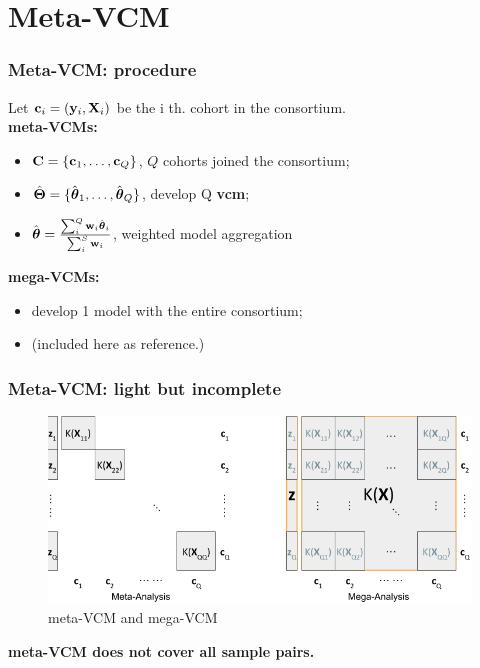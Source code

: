 \documentclass{beamer}
\begin{document}
\section{Meta-VCM}
\begin{frame}\frametitle{Meta-VCM: procedure}
  Let $\mathbf{c}_i=(\mathbf{y}_i, \mathbf{X}_i)$ be the i th. cohort in the consortium. \\
  \textbf{{\color{red}meta}-VCMs:}
  \begin{itemize}
  \item $\mathbf{C} = \{\mathbf{c}_1, \dots, \mathbf{c}_Q \}$, $Q$ cohorts joined the
    consortium;
  \item $\hat{\boldsymbol{\Theta}}=\{\hat{\boldsymbol{\theta}}_1, \dots, \hat{\boldsymbol{\theta}}_Q\}$,
    develop Q \textbf{vcm};
  \item
    $\hat{\boldsymbol{\theta}} = \frac{\sum_i^Q \mathbf{w}_i \hat{\boldsymbol{\theta}}_i}{\sum_i^S
      \mathbf{w}_i}$, weighted model aggregation
  \end{itemize}
  \textbf{{\color{red}mega}-VCMs:}
  \begin{itemize}
  \item develop 1 model with the entire consortium;
  \item (included here as reference.)
  \end{itemize}
\end{frame}
\begin{frame}\frametitle{Meta-VCM: light but incomplete}
  \begin{figure}
    \centering \includegraphics[width=.9\textwidth]{img/meta-mega}
    \caption{meta-VCM and mega-VCM}
    \label{fig:info_comp}
  \end{figure}
  \textbf{meta-VCM does not cover all sample pairs.}
\end{frame}
\end{document}

